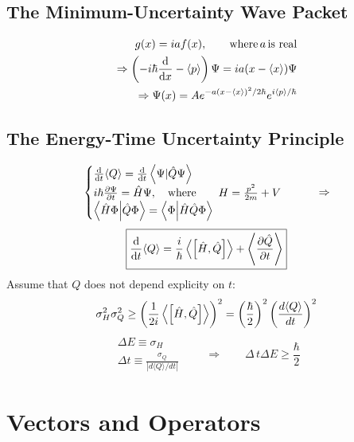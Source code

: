 \subsection{The Minimum-Uncertainty Wave Packet}
\[\begin{aligned}
	g(x)=iaf(x),\qquad\text{where} \,a\, \text{is real} \\ \Rightarrow
	\left(-i\hbar\dv{x}-\langle p\rangle\right) \Psi = ia(x-\langle x\rangle)\Psi \\ \Rightarrow
	\Psi(x) = Ae^{-a(x-\langle x\rangle)^2/2\hbar}e^{i\langle p\rangle/\hbar}
\end{aligned}
\]
\subsection{The Energy-Time Uncertainty Principle}
\[\begin{cases}
	\dv{t}\langle Q\rangle = \dv{t}\left\langle \Psi|\hat{Q}\Psi\right\rangle \\
	i\hbar\frac{\partial\Psi}{\partial t} = \hat{H}\Psi,\quad\text{where} \qquad H=\frac{p^2}{2m}+V \\
	\braket{\hat{H}\Phi}{\hat{Q}\Phi} = \braket{\Phi}{\hat{H}\hat{Q}\Phi}
\end{cases}  \qquad\Rightarrow\]
$${\boxed{ \dv{t}\langle Q\rangle =\frac{i}{\hbar}\left\langle \left[\hat{H},\hat{Q}\right] \right\rangle+\left\langle \frac{\partial\hat{Q}}{\partial t}\right\rangle    }}$$
Assume that \(Q\) does not depend explicity on \(t\):
\[
\sigma_H^2\sigma_Q^2\geq\left(\frac{1}{2i}\left\langle \qty[\hat{H},\hat{Q}]\right\rangle \right)^2 = \left(\frac{\hbar}{2}\right)^2\left(\frac{d\langle Q\rangle}{dt}\right)^2 
\]
$${\begin{aligned}
		\Delta E\equiv\sigma_H \\
		\Delta t\equiv\frac{\sigma_Q}{|d\langle Q\rangle/dt|} 
	\end{aligned} \qquad \Rightarrow \qquad 
	\Delta \,t\Delta E\geq \frac{\hbar}{2}}$$
\section{Vectors and Operators}
